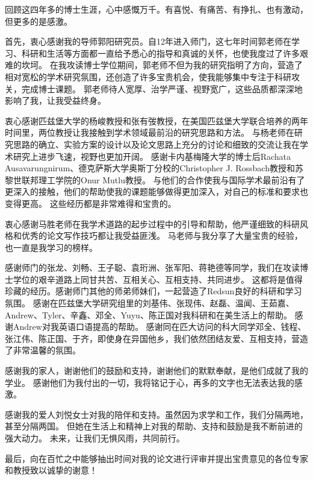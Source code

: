 

\begin{ack}
回顾这四年多的博士生涯，心中感慨万千。有喜悦、有痛苦、有挣扎、也有激动，但更多的是感激。

首先，衷心感谢我的导师郭阳研究员。自12年进入师门，这七年时间郭老师在学习、科研和生活等方面都一直给予悉心的指导和真诚的关怀，也使我度过了许多艰难的坎坷。
在我攻读博士学位期间，郭老师不但为我的研究指明了方向，营造了相对宽松的学术研究氛围，还创造了许多宝贵机会，使我能够集中专注于科研攻关，完成博士课题。
郭老师待人宽厚、治学严谨、视野宽广，这些品质都深深地影响了我，让我受益终身。

衷心感谢匹兹堡大学的杨峻教授和张有弢教授，在美国匹兹堡大学联合培养的两年时间里，两位教授让我接触到学术领域最前沿的研究思路和方法。
与杨老师在研究思路的确立、实验方案的设计以及论文思路上充分的讨论和细致的交流让我在学术研究上进步飞速，视野也更加开阔。
感谢卡内基梅隆大学的博士后Rachata Ausavarungnirum、德克萨斯大学奥斯丁分校的Christopher J. Rossbach教授和苏黎世联邦理工学院的Onur Mutlu教授。
与他们的合作使我与国际学术最前沿有了更深入的接触，他们的帮助使我的课题能够做得更加深入，对自己的标准和要求也变得更高。
这些经历都是非常难得和宝贵的。

衷心感谢马胜老师在我学术道路的起步过程中的引导和帮助，他严谨细致的科研风格和优秀的论文写作技巧都让我受益匪浅。
马老师与我分享了大量宝贵的经验，也一直是我学习的榜样。

感谢师门的张龙、刘畅、王子聪、袁珩洲、张军阳、蒋艳德等同学，我们在攻读博士学位的艰辛道路上同甘共苦、互相关心、互相支持、共同进步。
这都将是值得珍藏的经历。感谢师门其他的师弟师妹们，一起营造了Redsun良好的科研和学习氛围。
感谢在匹兹堡大学研究组里的刘基伟、张现伟、赵磊、温闻、王茹嘉、Andrew、Tyler、辛鑫、邓全、Yuyu、陈正国对我科研和在美生活上的帮助。
感谢Andrew对我英语口语提高的帮助。
感谢同在匹大访问的科大同学邓全、钱程、张江伟、陈正国、于齐，即使身在异国他乡，我们依然团结友爱、互相支持，营造了非常温馨的氛围。

感谢我的家人，谢谢他们的鼓励和支持，谢谢他们的默默奉献，是他们成就了我的学业。
感谢他们为我付出的一切，我将铭记于心，再多的文字也无法表达我的感激。

感谢我的爱人刘悦女士对我的陪伴和支持。虽然因为求学和工作，我们分隔两地，甚至分隔两国。
但她在生活上和精神上对我的帮助、支持和鼓励是我不断前进的强大动力。
未来，让我们无惧风雨，共同前行。

最后，向在百忙之中能够抽出时间对我的论文进行评审并提出宝贵意见的各位专家和教授致以诚挚的谢意！

\end{ack}
